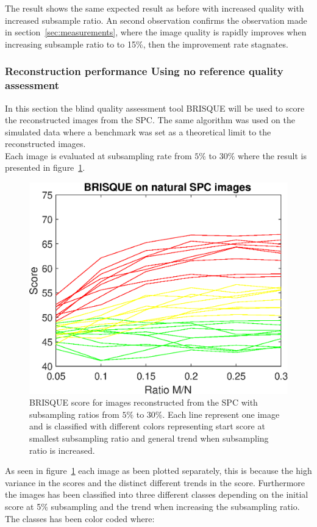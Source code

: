 The result shows the same expected result as before with increased quality with increased subsample ratio. An second observation confirms the observation made in section~\ref{sec:measurements}, where the image quality is rapidly improves when increasing subsample ratio to to 15\%, then the improvement rate stagnates. 



\subsubsection{Reconstruction performance Using no reference quality assessment}
\label{sec:SPC_BRISQUE}
In this section the blind quality assessment tool BRISQUE will be used to score the reconstructed images from the SPC. The same algorithm was used on the simulated data where a benchmark was set as a theoretical limit to the reconstructed images.\\[0.1in]     

Each image is evaluated at subsampling rate from $5\%$ to $30\%$ where the result is presented in figure~\ref{fig:brisque_plot}.

\begin{figure}[H]
    \centering
    \includegraphics[width = 0.7\linewidth]{result/SPC_NRQA/brisque_spc.eps}
    \caption{BRISQUE score for images reconstructed from the SPC with subsampling ratios from $5\%$ to $30\%$. Each line represent one image and is classified with different colors representing start score at smallest subsampling ratio and general trend when subsampling ratio is increased.}
    \label{fig:brisque_plot}
\end{figure}


As seen in figure~\ref{fig:brisque_plot} each image as been plotted separately, this is because the high variance in the scores and the distinct different trends in the score. Furthermore the images has been classified into three different classes depending on the initial score at 5\% subsampling and the trend when increasing the subsampling ratio. The classes has been color coded where:

